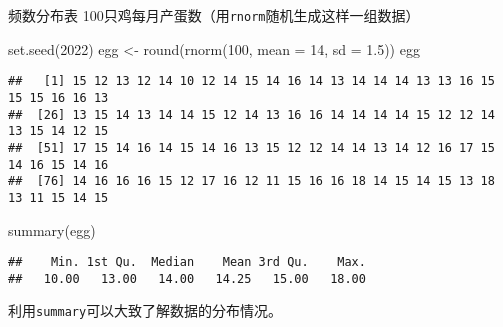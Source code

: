 \documentclass[
  10pt,
  ignorenonframetext,
]{beamer}
\newenvironment{Shaded}{\begin{snugshade}}{\end{snugshade}}
\newcommand{\AttributeTok}[1]{\textcolor[rgb]{0.77,0.63,0.00}{#1}}
\newcommand{\DecValTok}[1]{\textcolor[rgb]{0.00,0.00,0.81}{#1}}
\newcommand{\FloatTok}[1]{\textcolor[rgb]{0.00,0.00,0.81}{#1}}
\newcommand{\FunctionTok}[1]{\textcolor[rgb]{0.00,0.00,0.00}{#1}}
\newcommand{\NormalTok}[1]{#1}
\newcommand{\OtherTok}[1]{\textcolor[rgb]{0.56,0.35,0.01}{#1}}
\begin{document}
\begin{frame}[fragile]{频数分布表}
\protect\hypertarget{ux9891ux6570ux5206ux5e03ux8868}{}
100只鸡每月产蛋数（用\texttt{rnorm}随机生成这样一组数据）

\begin{Shaded}
\begin{Highlighting}[]
\FunctionTok{set.seed}\NormalTok{(}\DecValTok{2022}\NormalTok{)}
\NormalTok{egg }\OtherTok{\textless{}{-}} \FunctionTok{round}\NormalTok{(}\FunctionTok{rnorm}\NormalTok{(}\DecValTok{100}\NormalTok{, }\AttributeTok{mean =} \DecValTok{14}\NormalTok{, }\AttributeTok{sd =} \FloatTok{1.5}\NormalTok{))}
\NormalTok{egg}
\end{Highlighting}
\end{Shaded}

\begin{verbatim}
##   [1] 15 12 13 12 14 10 12 14 15 14 16 14 13 14 14 14 13 13 16 15 15 15 16 16 13
##  [26] 13 15 14 13 14 14 15 12 14 13 16 16 14 14 14 14 15 12 12 14 13 15 14 12 15
##  [51] 17 15 14 16 14 15 14 16 13 15 12 12 14 14 13 14 12 16 17 15 14 16 15 14 16
##  [76] 14 16 16 16 15 12 17 16 12 11 15 16 16 18 14 15 14 15 13 18 13 11 15 14 15
\end{verbatim}

\begin{Shaded}
\begin{Highlighting}[]
\FunctionTok{summary}\NormalTok{(egg)}
\end{Highlighting}
\end{Shaded}

\begin{verbatim}
##    Min. 1st Qu.  Median    Mean 3rd Qu.    Max. 
##   10.00   13.00   14.00   14.25   15.00   18.00
\end{verbatim}

利用\texttt{summary}可以大致了解数据的分布情况。
\end{frame}
\end{document}

